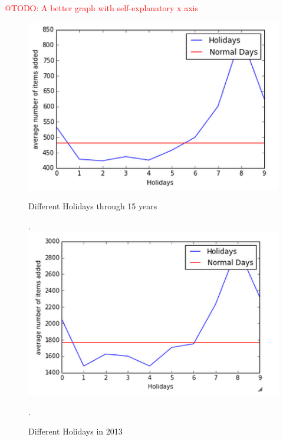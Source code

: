 \documentclass{llncs}
\makeatletter
\newcommand{\todo}[1]{\textcolor{red}{@TODO: #1}}
\makeatother
\begin{document}
\todo{A better graph with self-explanatory x axis}
\begin{figure}[H]
  \includegraphics[width=\linewidth]{alldif.png}
\caption{Different Holidays through 15 years}.
\label{alldiffholiday}
\endminipage\hfill
{}%
  \includegraphics[width=\linewidth]{diff.png}
\caption{Different Holidays in 2013}.
\label{diffholiday}
\endminipage
\end{figure}
\end{document}
